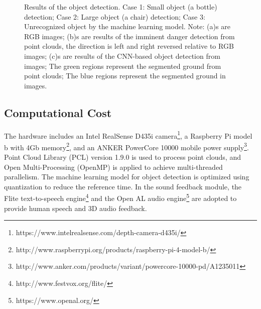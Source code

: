 \documentclass{ieeeaccess}
\begin{document}
\begin{figure}
    \centering
    \captionsetup[subfigure]{labelformat=empty}
    \qquad
    \qquad
    \caption{Results of the object detection. Case 1: Small object (a bottle) detection; Case 2: Large object (a chair) detection; Case 3: Unrecognized object by the machine learning model. Note: (a)s are RGB images; (b)s are results of the imminent danger detection from point clouds, the direction is left and right  reversed relative to RGB images; (c)s are results of the CNN-based object detection from images; The green regions represent the segmented ground from point clouds; The blue regions represent the segmented ground in images.}%
    \label{fig:objectdetection}
\end{figure}

\subsection{Computational Cost}

The hardware includes an Intel RealSense D435i camera\footnote{https://www.intelrealsense.com/depth-camera-d435i/}, a Raspberry Pi model b with 4Gb memory\footnote{http://www.raspberrypi.org/products/raspberry-pi-4-model-b/}, and an ANKER PowerCore 10000 mobile power supply\footnote{http://www.anker.com/products/variant/powercore-10000-pd/A1235011}. Point Cloud Library (PCL) version 1.9.0 is used to process point clouds, and Open Multi-Processing (OpenMP) is applied to achieve multi-threaded parallelism. The machine learning model for object detection is optimized using quantization to reduce the reference time. In the sound feedback module, the Flite text-to-speech engine\footnote{http://www.festvox.org/flite/} and the Open AL audio engine\footnote{https://www.openal.org/} are adopted to provide human speech and 3D audio feedback.
\end{document}
